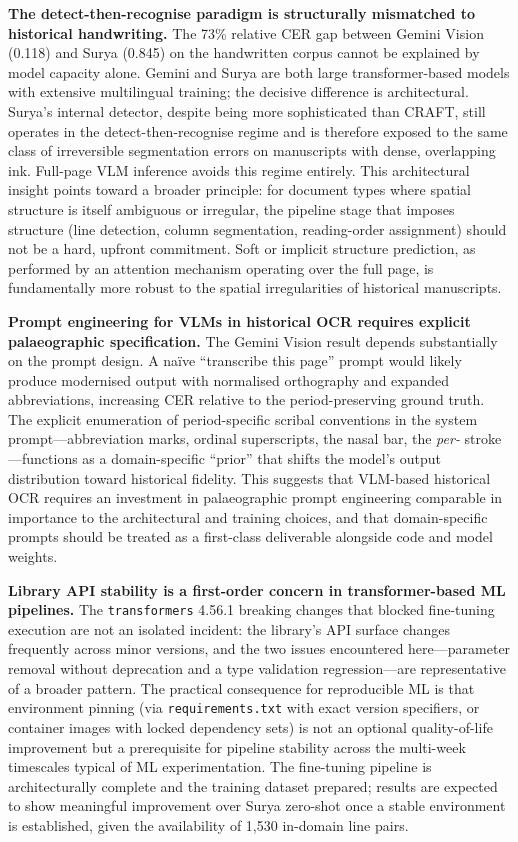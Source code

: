 \documentclass[11pt,a4paper]{article}
\begin{document}
\textbf{The detect-then-recognise paradigm is structurally mismatched to historical
handwriting.} The 73\% relative CER gap between Gemini Vision (0.118) and Surya (0.845)
on the handwritten corpus cannot be explained by model capacity alone. Gemini and Surya are
both large transformer-based models with extensive multilingual training; the decisive
difference is architectural. Surya's internal detector, despite being more sophisticated
than CRAFT, still operates in the detect-then-recognise regime and is therefore exposed to
the same class of irreversible segmentation errors on manuscripts with dense, overlapping
ink. Full-page VLM inference avoids this regime entirely. This architectural insight points
toward a broader principle: for document types where spatial structure is itself ambiguous
or irregular, the pipeline stage that imposes structure (line detection, column
segmentation, reading-order assignment) should not be a hard, upfront commitment. Soft
or implicit structure prediction, as performed by an attention mechanism operating over
the full page, is fundamentally more robust to the spatial irregularities of historical
manuscripts.

\textbf{Prompt engineering for VLMs in historical OCR requires explicit palaeographic
specification.} The Gemini Vision result depends substantially on the prompt design. A
na\"ive ``transcribe this page'' prompt would likely produce modernised output with
normalised orthography and expanded abbreviations, increasing CER relative to the
period-preserving ground truth. The explicit enumeration of period-specific scribal
conventions in the system prompt---abbreviation marks, ordinal superscripts, the nasal bar,
the \textit{per-} stroke---functions as a domain-specific ``prior'' that shifts the model's
output distribution toward historical fidelity. This suggests that VLM-based historical
OCR requires an investment in palaeographic prompt engineering comparable in importance to
the architectural and training choices, and that domain-specific prompts should be treated
as a first-class deliverable alongside code and model weights.

\textbf{Library API stability is a first-order concern in transformer-based ML pipelines.}
The \texttt{transformers} 4.56.1 breaking changes that blocked fine-tuning execution are
not an isolated incident: the library's API surface changes frequently across minor versions,
and the two issues encountered here---parameter removal without deprecation and a type
validation regression---are representative of a broader pattern. The practical consequence
for reproducible ML is that environment pinning (via \texttt{requirements.txt} with exact
version specifiers, or container images with locked dependency sets) is not an optional
quality-of-life improvement but a prerequisite for pipeline stability across the multi-week
timescales typical of ML experimentation. The fine-tuning pipeline is architecturally
complete and the training dataset prepared; results are expected to show meaningful
improvement over Surya zero-shot once a stable environment is established, given the
availability of 1,530 in-domain line pairs.
\end{document}
